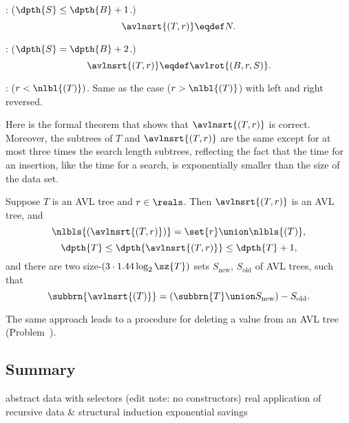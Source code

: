 \begin{definition}
\begin{definition}
: ($\dpth{S} \leq \dpth{B}+1$.)
\[
\avlnsrt{(T,r)} \eqdef N.
\]

: ($\dpth{S} = \dpth{B}+2$.)
\[
\avlnsrt{(T,r)} \eqdef \avlrot{(B,r,S)}.
\]

: ($r < \nlbl{(T)})$.  Same as the case ($r >
\nlbl{(T)}$) with left and right reversed.
\end{definition}

Here is the formal theorem that shows that $\avlnsrt{(T,r)}$ is
correct.  Moreover, the subtrees of $T$ and $\avlnsrt{(T,r)}$ are the
same except for at most three times the search length subtrees,
reflecting the fact that the time for an insertion, like the time for
a search, is exponentially smaller than the size of the data set.

\begin{theorem}\label{thm:correct-avl-insert}
Suppose $T$ is an AVL tree and $r \in \reals$.
Then $\avlnsrt{(T,r)}$ is an AVL tree, and
\[
\nlbls{(\avlnsrt{(T,r)})} = \set{r} \union \nlbls{(T)},
\]
\[
\dpth{T} \leq \dpth{\avlnsrt{(T,r)}} \leq \dpth{T}+1,
\]
and there are two size-$(3\cdot 1.44 \log_2 \sz{T})$ sets $S_{\text{new}}$,
$S_{\text{old}}$ of AVL trees, such that
\[
\subbrn{\avlnsrt{(T)}} = (\subbrn{T}\union S_{\text{new}}) - S_{\text{old}}.
\]
\end{theorem}

The same approach leads to a procedure for deleting a value from an
AVL tree (Problem~).

\begin{editingnotes}
\subsection{Summary}
abstract data with selectors (edit note: no constructors)
real application of recursive data & structural induction
exponential savings
\end{editingnotes}

\begin{problems}
\practiceproblems
{}

\classproblems
{}

\homeworkproblems
{}

\examproblems
{}
\end{problems}


\end{definition}
